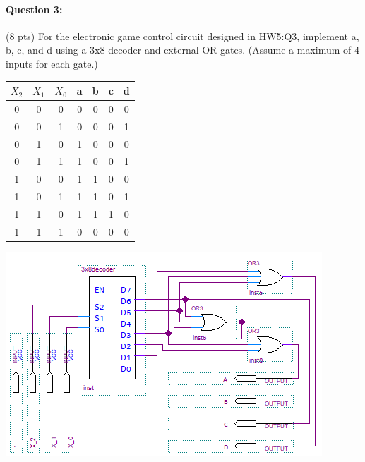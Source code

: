 \documentclass[12pt,letterpaper,titlepage]{report}
\begin{document}
\begin{raggedright}
\paragraph{Question 3:}
(8 pts) For the electronic game control circuit designed in HW5:Q3, implement a, b, c, and d using a 3x8 decoder and external OR gates. (Assume a maximum of 4 inputs for each gate.) 
\begin{paracol}{2}
\begin{center}
\def\arraystretch{1.1}
\begin{tabular}{|c c c| c c c c |}\hline
$X_2$ & $X_1$ & $X_0$ & a & b & c & d \\\hline
            0 & 0 & 0 & 0 & 0 & 0 & 0 \\\hline
            0 & 0 & 1 & 0 & 0 & 0 & 1 \\\hline
            0 & 1 & 0 & 1 & 0 & 0 & 0 \\\hline
            0 & 1 & 1 & 1 & 0 & 0 & 1 \\\hline
            1 & 0 & 0 & 1 & 1 & 0 & 0 \\\hline
            1 & 0 & 1 & 1 & 1 & 0 & 1 \\\hline
            1 & 1 & 0 & 1 & 1 & 1 & 0 \\\hline
            1 & 1 & 1 & 0 & 0 & 0 & 0 \\\hline
\end{tabular}
\end{center}
\switchcolumn
\includegraphics[width=0.9\columnwidth, height=\textheight, keepaspectratio=true]{hw6p3}
\end{paracol}


\clearpage

\end{raggedright}
\end{document}
